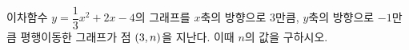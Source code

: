 이차함수 $y=\dfrac{1}{3}x^2+2x-4$의 그래프를 $x$축의 방향으로 $3$만큼, $y$축의 방향으로 $-1$만큼 평행이동한 그래프가 점 $(3{,}\mkern3mu\mathopen{}n)$을 지난다. 이때 $n$의 값을 구하시오.
